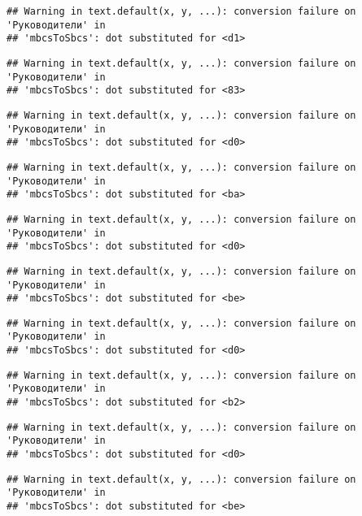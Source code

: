 \documentclass[
]{article}
\begin{document}
\begin{verbatim}
## Warning in text.default(x, y, ...): conversion failure on 'Руководители' in
## 'mbcsToSbcs': dot substituted for <d1>
\end{verbatim}

\begin{verbatim}
## Warning in text.default(x, y, ...): conversion failure on 'Руководители' in
## 'mbcsToSbcs': dot substituted for <83>
\end{verbatim}

\begin{verbatim}
## Warning in text.default(x, y, ...): conversion failure on 'Руководители' in
## 'mbcsToSbcs': dot substituted for <d0>
\end{verbatim}

\begin{verbatim}
## Warning in text.default(x, y, ...): conversion failure on 'Руководители' in
## 'mbcsToSbcs': dot substituted for <ba>
\end{verbatim}

\begin{verbatim}
## Warning in text.default(x, y, ...): conversion failure on 'Руководители' in
## 'mbcsToSbcs': dot substituted for <d0>
\end{verbatim}

\begin{verbatim}
## Warning in text.default(x, y, ...): conversion failure on 'Руководители' in
## 'mbcsToSbcs': dot substituted for <be>
\end{verbatim}

\begin{verbatim}
## Warning in text.default(x, y, ...): conversion failure on 'Руководители' in
## 'mbcsToSbcs': dot substituted for <d0>
\end{verbatim}

\begin{verbatim}
## Warning in text.default(x, y, ...): conversion failure on 'Руководители' in
## 'mbcsToSbcs': dot substituted for <b2>
\end{verbatim}

\begin{verbatim}
## Warning in text.default(x, y, ...): conversion failure on 'Руководители' in
## 'mbcsToSbcs': dot substituted for <d0>
\end{verbatim}

\begin{verbatim}
## Warning in text.default(x, y, ...): conversion failure on 'Руководители' in
## 'mbcsToSbcs': dot substituted for <be>
\end{verbatim}
\end{document}
